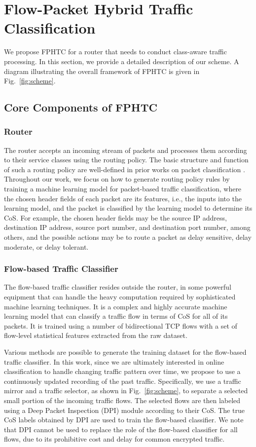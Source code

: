 
\section{Flow-Packet Hybrid Traffic Classification}
\label{sec:proposed}

We propose FPHTC for a router that needs to conduct class-aware traffic processing. In this section, we provide a detailed description of our scheme. A diagram illustrating the overall framework of FPHTC is given in Fig.~\ref{fig:scheme}.


\subsection{Core Components of FPHTC}
\subsubsection{Router}
The router accepts an incoming stream of packets and processes them according to their service classes using the routing policy. The basic structure and function of such a routing policy are well-defined in prior works on packet classification \cite{Gupta99, Gupta01}. Throughout our work, we focus on how to generate routing
policy rules by training a machine learning model for packet-based traffic classification, where the chosen header fields of each packet are its features, i.e., the inputs into the learning model, and the packet is classified by the learning model to determine its CoS. For example, the chosen header fields may be the source IP address, destination IP address, source port number, and destination port number, among others, and the possible actions may be to route a packet as delay sensitive, delay moderate, or delay tolerant.

\subsubsection{Flow-based Traffic Classifier}
The flow-based traffic classifier resides outside the router, in some powerful equipment that can handle the heavy computation required by sophisticated machine learning techniques. It is a complex and highly accurate machine learning model that can classify a traffic flow in terms of CoS for all of its packets. It is trained using a number of bidirectional TCP flows with a set of flow-level statistical features extracted from the raw dataset.

Various methods are possible to generate the training dataset for the flow-based traffic classifier. In this work, since we are ultimately interested in online classification to handle changing traffic pattern over time, we propose to use a continuously updated recording of the past traffic. Specifically, we use a traffic mirror and a traffic selector, as shown in Fig.~\ref{fig:scheme}, to separate a selected small portion of the incoming traffic flows. The selected flows are then labeled using a Deep Packet Inspection (DPI) module according to their CoS. The true CoS labels obtained by DPI are used to train the flow-based classifier. We note that DPI cannot be used to replace the role of the flow-based classifier for all flows, due to its prohibitive cost and delay for common encrypted traffic. 

